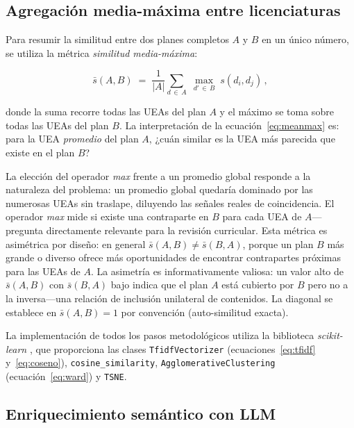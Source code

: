 \documentclass[11pt,a4paper]{article}
\newcommand{\simij}{s(d_i, d_j)}
\newcommand{\simAB}{\bar{s}(A,B)}
\begin{document}
\subsection{Agregación media-máxima entre licenciaturas}

Para resumir la similitud entre dos planes completos $A$ y $B$ en un único número, se utiliza la métrica \textit{similitud media-máxima}:

\begin{equation}
  \simAB \;=\;
  \frac{1}{|A|}\sum_{d\,\in\, A}\;\max_{d'\,\in\, B}\;\simij\,,
  \label{eq:meanmax}
\end{equation}

donde la suma recorre todas las UEAs del plan $A$ y el máximo se toma sobre todas las UEAs del plan $B$.
La interpretación de la ecuación~\eqref{eq:meanmax} es: para la UEA \textit{promedio} del plan $A$, ¿cuán similar es la UEA más parecida que existe en el plan $B$?

La elección del operador \textit{max} frente a un promedio global responde a la naturaleza del problema: un promedio global quedaría dominado por las numerosas UEAs sin traslape, diluyendo las señales reales de coincidencia.
El operador \textit{max} mide si existe una contraparte en $B$ para cada UEA de $A$---pregunta directamente relevante para la revisión curricular.
Esta métrica es asimétrica por diseño: en general $\simAB \neq \bar{s}(B,A)$, porque un plan $B$ más grande o diverso ofrece más oportunidades de encontrar contrapartes próximas para las UEAs de $A$.
La asimetría es informativamente valiosa: un valor alto de $\simAB$ con $\bar{s}(B,A)$ bajo indica que el plan $A$ está cubierto por $B$ pero no a la inversa---una relación de inclusión unilateral de contenidos.
La diagonal se establece en $\simAB = 1$ por convención (auto-similitud exacta).

La implementación de todos los pasos metodológicos utiliza la biblioteca \textit{scikit-learn} \citep{Pedregosa2011}, que proporciona las clases \texttt{TfidfVectorizer} (ecuaciones~\eqref{eq:tfidf} y~\eqref{eq:coseno}), \texttt{cosine\_similarity}, \texttt{AgglomerativeClustering} (ecuación~\eqref{eq:ward}) y \texttt{TSNE}.

\subsection{Enriquecimiento semántico con LLM}
\end{document}
